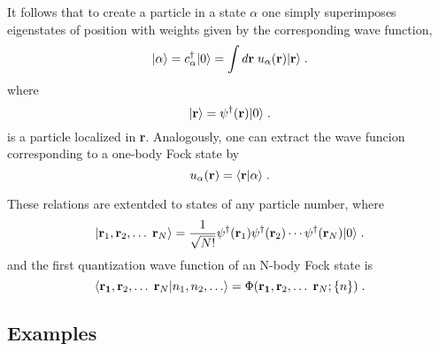 It follows that to create a particle in a state $\alpha$ one simply superimposes eigenstates of position with weights given by the corresponding wave function, 
\begin{equation}
  \vert\alpha\rangle = c^\dag_\alpha  \vert0\rangle  
   = \int d{\bf r}  \; u_\alpha({\bf r})  \vert{\bf r}\rangle  \; .
\label{a_state}
\end{equation}
where
\begin{equation}
  \vert{\bf r}\rangle = \psi^\dag({\bf r})  \vert0\rangle 
 \label{r_state} \; .
\end{equation}
is a particle localized in {\bf r}.
Analogously, one can extract the wave funcion corresponding to a one-body Fock state by
\begin{equation}
  u_\alpha({\bf r}) = \langle {\bf r}  \vert \alpha \rangle
 \label{ua_wf} \; .
\end{equation}

These relations are extentded to states of any particle number, where
\begin{equation}
  \vert{\bf r}_1, {\bf r}_2, \ldots \; {\bf r}_N \rangle =
  \frac{1}{\sqrt{N!}} \psi^\dag({\bf r}_1)  \psi^\dag({\bf r}_2) \cdots \psi^\dag({\bf r}_N) \vert0\rangle 
 \label{rN_state} \; .
\end{equation}
and the first quantization wave function of an N-body Fock state is
\begin{equation}
  \langle{\bf r_1}, {\bf r}_2, \ldots \; {\bf r}_N \vert n_1, n_2, \ldots  \rangle
  = \Phi({\bf r_1}, {\bf r}_2, \ldots \; {\bf r}_N; \{n\}) 
 \label{PhiN_wf}\; .
\end{equation}



\subsection{Examples}

